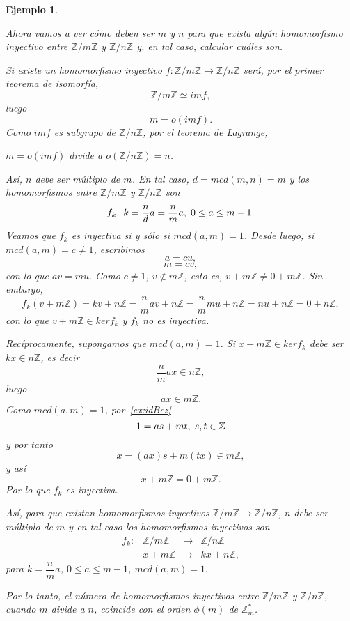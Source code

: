 \documentclass[12pt]{article}
\newtheorem{example}{Ejemplo}[theorem]
\begin{document}
\begin{example}
\begin{enumerate}
Ahora vamos a ver cómo deben ser $m$ y $n$ para que exista algún homomorfismo inyectivo entre $\mathbb{Z}/m\mathbb{Z}$ y $\mathbb{Z}/n\mathbb{Z}$ y, en tal caso, calcular cuáles son.

Si existe un homomorfismo inyectivo $f\colon\mathbb{Z}/m\mathbb{Z} \longrightarrow \mathbb{Z}/n\mathbb{Z}$ será, por el primer teorema de isomorfía, $$\mathbb{Z}/m\mathbb{Z} \simeq im f,$$ luego $$m= o(im f).$$ Como $im f$ es subgrupo de $\mathbb{Z}/n\mathbb{Z}$, por el teorema de Lagrange, \begin{center}$m = o(im f)$ divide a $o(\mathbb{Z}/n\mathbb{Z})= n$.\end{center}
Así, $n$ debe ser múltiplo de $m$. En tal caso, $d=mcd(m,n)=m$ y los homomorfismos entre $\mathbb{Z}/m\mathbb{Z}$ y $\mathbb{Z}/n\mathbb{Z}$ son $$f_{k}, \hspace{0.1cm} k = \dfrac{n}{d}a=\dfrac{n}{m}a, \hspace{0.1cm} 0 \leq a \leq m-1.$$
Veamos que $f_{k}$ es inyectiva si y sólo si $mcd(a,m)=1$. Desde luego, si $mcd(a,m)=c \neq 1$, escribimos $$a = cu,$$ $$m= cv,$$ con lo que $av = mu.$ Como $c \neq 1$, $v \notin m\mathbb{Z}$, esto es, $v + m\mathbb{Z} \neq 0 + m\mathbb{Z}$. Sin embargo, $$f_{k}(v + m\mathbb{Z}) = kv + n\mathbb{Z} = \dfrac{n}{m}av + n\mathbb{Z} = \dfrac{n}{m}mu + n\mathbb{Z} = nu + n\mathbb{Z} = 0 + n\mathbb{Z},$$ con lo que $v + m\mathbb{Z} \in ker f_{k}$ y $f_{k}$ no es inyectiva.

Recíprocamente, supongamos que $mcd(a,m)=1$. Si $x + m\mathbb{Z} \in ker f_{k}$ debe ser $kx \in n\mathbb{Z}$, es decir $$\dfrac{n}{m}ax \in n\mathbb{Z},$$ luego $$ax \in m\mathbb{Z}.$$ Como $mcd(a,m)=1$, por~\ref{ex:idBez} $$1 = as + mt, \hspace{0.1cm} s,t \in \mathbb{Z}$$ y por tanto $$x = (ax)s + m(tx) \in m\mathbb{Z},$$ y así $$x + m\mathbb{Z} = 0 + m\mathbb{Z}.$$ Por lo que $f_{k}$ es inyectiva.

Así, para que existan homomorfismos inyectivos $\mathbb{Z}/m\mathbb{Z}\longrightarrow \mathbb{Z}/n\mathbb{Z}$, $n$ debe ser múltiplo de $m$ y en tal caso los homomorfismos inyectivos son  $$\begin{array}{rccl}
f_{k}\colon &\mathbb{Z}/m\mathbb{Z}& \longrightarrow &\mathbb{Z}/n\mathbb{Z}\\
&x+m\mathbb{Z}& \longmapsto &kx + n\mathbb{Z},
\end{array}
$$ para $k = \dfrac{n}{m}a$, $0 \leq a \leq m-1$, $mcd(a,m)=1.$

Por lo tanto, el número de homomorfismos inyectivos entre $\mathbb{Z}/m\mathbb{Z}$ y $\mathbb{Z}/n\mathbb{Z}$, cuando $m$ divide a $n$, coincide con el orden $\phi(m)$ de $\mathbb{Z}_{m}^{\ast}$.


\end{enumerate}
\end{example}
\end{document}

